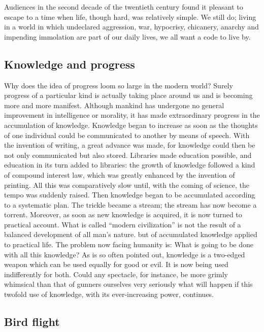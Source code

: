 \documentclass[11pt]{article}
\begin{document}
Audiences in the second decade of the twentieth century found it pleasant to escape to a time when life, though hard, was relatively simple. We still do; living in a world in which undeclared aggression, war, hypocrisy, chicanery, anarchy and impending immolation are part of our daily lives, we all want a code to live by.
\subsection{Knowledge and progress}
\label{sec-2-22}

Why does the idea of progress loom so large in the modern world? Surely progress of a particular kind is actually taking place around us and is becoming more and more manifest. Although mankind has undergone no general improvement in intelligence or morality, it has made extraordinary progress in the accumulation of knowledge. Knowledge began to increase as soon as the thoughts of one individual could be communicated to another by means of speech. With the invention of writing, a great advance was made, for knowledge could then be not only communicated but also stored. Libraries made education possible, and education in its turn added to libraries: the growth of knowledge followed a kind of compound interest law, which was greatly enhanced by the invention of printing. All this was comparatively slow until, with the coming of science, the tempo was suddenly raised. Then knowledge began to be accumulated according to a systematic plan. The trickle became a stream; the stream has now become a torrent. Moreover, as soon as new knowledge is acquired, it is now turned to practical account. What is called ``modern civilization'' is not the result of a balanced development of all man's nature. but of accumulated knowledge applied to practical life. The problem now facing humanity is: What is going to be done with all this knowledge? As is so often pointed out, knowledge is a two-edged weapon which can be used equally for good or evil. It is now being used indifferently for both. Could any spectacle, for instance, be more grimly whimsical than that of gunners ourselves very seriously what will happen if this twofold use of knowledge, with its ever-increasing power, continues.
\subsection{Bird flight}
\label{sec-2-23}
\end{document}
